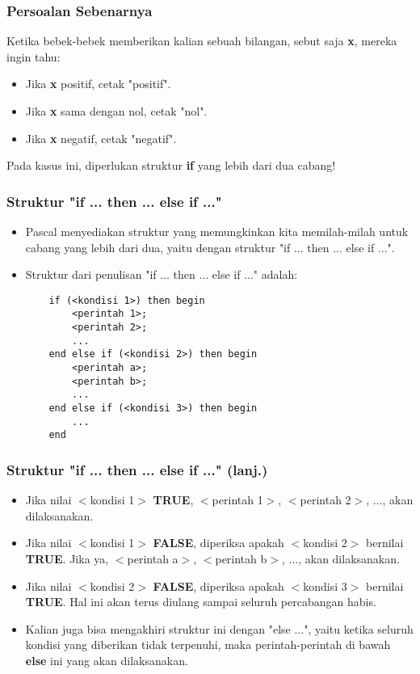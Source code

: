 \documentclass{beamer}
\begin{document}
\begin{frame}
\frametitle{Persoalan Sebenarnya}
Ketika bebek-bebek memberikan kalian sebuah bilangan, sebut saja \textbf{x}, mereka ingin tahu:
\begin{itemize}
	\item Jika \textbf{x} positif, cetak "positif".
	\item Jika \textbf{x} sama dengan nol, cetak "nol".
	\item Jika \textbf{x} negatif, cetak "negatif".
\end{itemize}

Pada kasus ini, diperlukan struktur \textbf{if} yang lebih dari dua cabang!
\end{frame}

\begin{frame}[fragile]
\frametitle{Struktur "if ... then ... else if ..."}
\begin{itemize}
	\item Pascal menyediakan struktur yang memungkinkan kita memilah-milah untuk cabang yang lebih dari dua, yaitu dengan struktur "if ... then ... else if ...".
	\item Struktur dari penulisan "if ... then ... else if ..." adalah:
	\begin{lstlisting}
	if (<kondisi 1>) then begin
	    <perintah 1>;
	    <perintah 2>;
	    ...
	end else if (<kondisi 2>) then begin
	    <perintah a>;
	    <perintah b>;
	    ...	
	end else if (<kondisi 3>) then begin
	    ...
	end
	\end{lstlisting}

\end{itemize}
\end{frame}

\begin{frame}
\frametitle{Struktur "if ... then ... else if ..." (lanj.)}
\begin{itemize}
	\item Jika nilai $<$kondisi 1$>$ \textbf{TRUE}, $<$perintah 1$>$, $<$perintah 2$>$, ..., akan dilaksanakan.
	\item Jika nilai $<$kondisi 1$>$ \textbf{FALSE}, diperiksa apakah $<$kondisi 2$>$ bernilai \textbf{TRUE}. Jika ya, $<$perintah a$>$, $<$perintah b$>$, ..., akan dilaksanakan.
	\item Jika nilai $<$kondisi 2$>$ \textbf{FALSE}, diperiksa apakah $<$kondisi 3$>$ bernilai \textbf{TRUE}. Hal ini akan terus diulang sampai seluruh percabangan habis.
	\item Kalian juga bisa mengakhiri struktur ini dengan "else ...", yaitu ketika seluruh kondisi yang diberikan tidak terpenuhi, maka perintah-perintah di bawah \textbf{else} ini yang akan dilaksanakan.
\end{itemize}
\end{frame}
\end{document}
